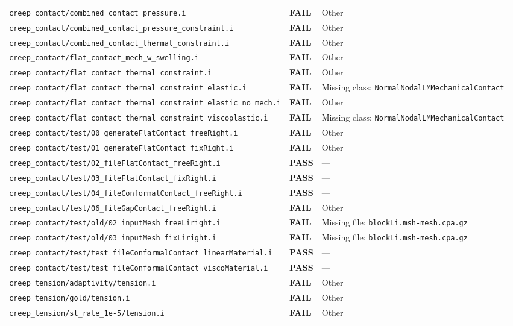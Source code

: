 \documentclass[10pt,letterpaper]{article}
\newcommand{\PASS}{\textcolor{passgreen}{\textbf{PASS}}}
\newcommand{\FAIL}{\textcolor{failred}{\textbf{FAIL}}}
\newcommand{\code}[1]{\texttt{\small #1}}
\begin{document}
\begin{longtable}{p{} l p{}}
\code{creep\_contact/combined\_contact\_pressure.i} & \FAIL & Other \\
\code{creep\_contact/combined\_contact\_pressure\_constraint.i} & \FAIL & Other \\
\code{creep\_contact/combined\_contact\_thermal\_constraint.i} & \FAIL & Other \\
\code{creep\_contact/flat\_contact\_mech\_w\_swelling.i} & \FAIL & Other \\
\code{creep\_contact/flat\_contact\_thermal\_constraint.i} & \FAIL & Other \\
\code{creep\_contact/flat\_contact\_thermal\_constraint\_elastic.i} & \FAIL & Missing class: \code{NormalNodalLMMechanicalContact} \\
\code{creep\_contact/flat\_contact\_thermal\_constraint\_elastic\_no\_mech.i} & \FAIL & Other \\
\code{creep\_contact/flat\_contact\_thermal\_constraint\_viscoplastic.i} & \FAIL & Missing class: \code{NormalNodalLMMechanicalContact} \\
\code{creep\_contact/test/00\_generateFlatContact\_freeRight.i} & \FAIL & Other \\
\code{creep\_contact/test/01\_generateFlatContact\_fixRight.i} & \FAIL & Other \\
\code{creep\_contact/test/02\_fileFlatContact\_freeRight.i} & \PASS & --- \\
\code{creep\_contact/test/03\_fileFlatContact\_fixRight.i} & \PASS & --- \\
\code{creep\_contact/test/04\_fileConformalContact\_freeRight.i} & \PASS & --- \\
\code{creep\_contact/test/06\_fileGapContact\_freeRight.i} & \FAIL & Other \\
\code{creep\_contact/test/old/02\_inputMesh\_freeLiright.i} & \FAIL & Missing file: \code{blockLi.msh-mesh.cpa.gz} \\
\code{creep\_contact/test/old/03\_inputMesh\_fixLiright.i} & \FAIL & Missing file: \code{blockLi.msh-mesh.cpa.gz} \\
\code{creep\_contact/test/test\_fileConformalContact\_linearMaterial.i} & \PASS & --- \\
\code{creep\_contact/test/test\_fileConformalContact\_viscoMaterial.i} & \PASS & --- \\
\code{creep\_tension/adaptivity/tension.i} & \FAIL & Other \\
\code{creep\_tension/gold/tension.i} & \FAIL & Other \\
\code{creep\_tension/st\_rate\_1e-5/tension.i} & \FAIL & Other \\

\end{longtable}
\end{document}
